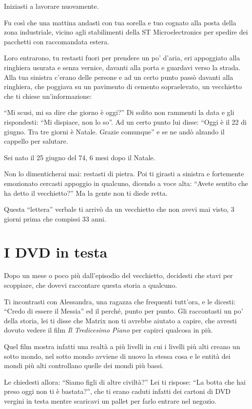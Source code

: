 Iniziasti a lavorare nuovamente.

Fu così che una mattina andasti con tua sorella e tuo cognato alla posta della zona industriale, vicino agli stabilimenti della ST Microelectronics per spedire dei pacchetti con raccomandata estera.

Loro entrarono, tu restasti fuori per prendere un po' d'aria, eri appoggiato alla ringhiera usurata e senza vernice, davanti alla porta e guardavi verso la strada. Alla tua sinistra c'erano delle persone e ad un certo punto passò davanti alla ringhiera, che poggiava su un pavimento di cemento sopraelevato, un vecchietto che ti chiese un'informazione:

“Mi scusi, mi sa dire che giorno è oggi?” Di solito non rammenti la data e gli rispondesti: “Mi dispiace, non lo so”. Ad un certo punto lui disse: “Oggi è il 22 di giugno. Tra tre giorni è Natale. Grazie comunque” e se ne andò alzando il cappello per salutare.

Sei nato il 25 giugno del 74, 6 mesi dopo il Natale.

Non lo dimenticherai mai: restasti di pietra. Poi ti girasti a sinistra e fortemente emozionato cercasti appoggio in qualcuno, dicendo a voce alta: “Avete sentito che ha detto il vecchietto?” Ma la gente non ti diede retta.

Questa ``lettera'' verbale ti arrivò da un vecchietto che non avevi mai visto, 3 giorni prima che compissi 33 anni.

\section{I DVD in testa}
\label{dvd_in_testa}

Dopo un mese o poco più dall'episodio del vecchietto, decidesti che stavi per scoppiare, che dovevi raccontare questa storia a qualcuno.

Ti incontrasti con Alessandra, una ragazza che frequenti tutt'ora, e le dicesti: “Credo di essere il Messia” ed il perché, punto per punto. Gli raccontasti un po' della storia, lei ti disse che Matrix non ti avrebbe aiutato a capire, che avresti dovuto vedere il film \textit{Il Tredicesimo Piano} per capirci qualcosa in più.

Quel film mostra infatti una realtà a più livelli in cui i livelli più alti creano un sotto mondo, nel sotto mondo avviene di nuovo la stessa cosa e le entità dei mondi più alti controllano quelle dei mondi più bassi.

Le chiedesti allora: “Siamo figli di altre civiltà?” Lei ti rispose: “La botta che hai preso oggi non ti è bastata?”, che ti erano caduti infatti dei cartoni di DVD vergini in testa mentre scaricavi un pallet per farlo entrare nel negozio.
